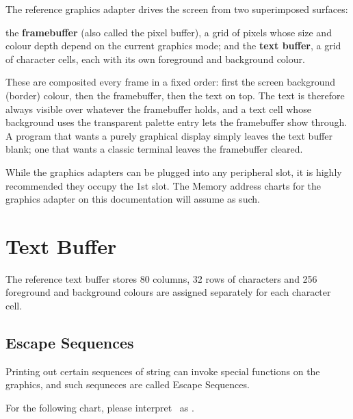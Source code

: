 The reference graphics adapter drives the screen from two superimposed surfaces:

\begin{outline}
\1the \textbf{framebuffer} (also called the pixel buffer), a grid of pixels whose size and colour depth depend on the current graphics mode; and
\1the \textbf{text buffer}, a grid of character cells, each with its own foreground and background colour.
\end{outline}

These are composited every frame in a fixed order: first the screen background (border) colour, then the framebuffer, then the text on top. The text is therefore always visible over whatever the framebuffer holds, and a text cell whose background uses the transparent palette entry lets the framebuffer show through. A program that wants a purely graphical display simply leaves the text buffer blank; one that wants a classic terminal leaves the framebuffer cleared.

While the graphics adapters can be plugged into any peripheral slot, it is highly recommended they occupy the 1st slot. The Memory address charts for the graphics adapter on this documentation will assume as such.

\section{Text Buffer}

The reference text buffer stores 80 columns, 32 rows of characters and 256 foreground and background colours are assigned separately for each character cell.

\subsection{Escape Sequences}

\newcommand{\csi}{{\condensedfont{CSI}}}

Printing out certain sequences of string can invoke special functions on the graphics, and such sequneces are called Escape Sequences.

For the following chart, please interpret \csi\ as \code{\rs{}x1B [}.

